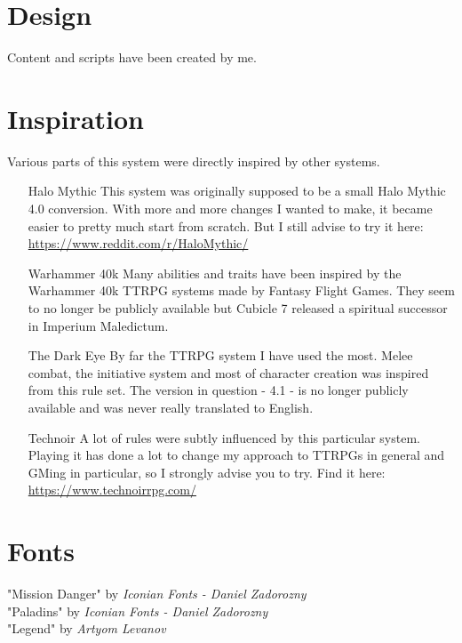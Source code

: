 \section*{Design}
Content and scripts have been created by me.

\section*{Inspiration}
Various parts of this system were directly inspired by other systems.
\begin{enumerate}
	\item[Halo Mythic] This system was originally supposed to be a small Halo Mythic 4.0 conversion. With more and more changes I wanted to make, it became easier to pretty much start from scratch. But I still advise to try it here:\\ \url{https://www.reddit.com/r/HaloMythic/}
	\item[Warhammer 40k] Many abilities and traits have been inspired by the Warhammer 40k TTRPG systems made by Fantasy Flight Games. They seem to no longer be publicly available but Cubicle 7 released a spiritual successor in Imperium Maledictum.
	\item[The Dark Eye] By far the TTRPG system I have used the most. Melee combat, the initiative system and most of character creation was inspired from this rule set. The version in question - 4.1 - is no longer publicly available and was never really translated to English.
	\item[Technoir] A lot of rules were subtly influenced by this particular system. Playing it has done a lot to change my approach to TTRPGs in general and GMing in particular, so I strongly advise you to try. Find it here:\\ \url{https://www.technoirrpg.com/}
\end{enumerate}

\section*{Fonts}
"Mission Danger" by \textit{Iconian Fonts - Daniel Zadorozny}\\
"Paladins" by \textit{Iconian Fonts - Daniel Zadorozny}\\
"Legend" by \textit{Artyom Levanov}
